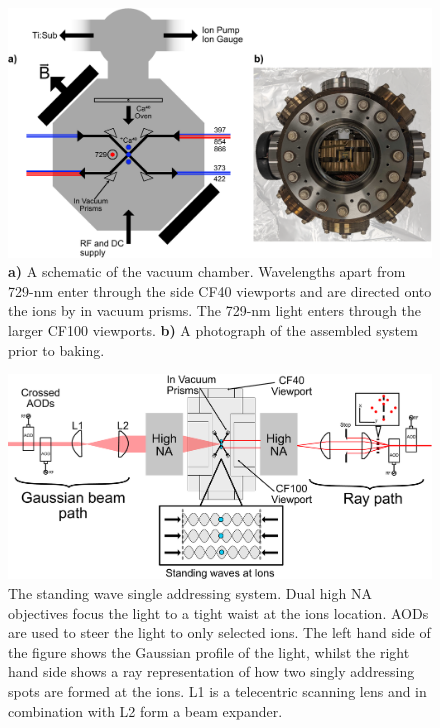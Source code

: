\begin{figure}
  \begin{center}
   \noindent\includegraphics[width=0.9\linewidth]{figures/pdf_figure/vacuum_can-crop.pdf}
  \end{center}
  \caption{
    \textbf{a)} 
    A schematic of the vacuum chamber.
    Wavelengths apart from 729-nm enter through the side CF40 viewports and are
    directed onto the ions by in vacuum prisms. The 729-nm light enters through
    the larger CF100 viewports.  \textbf{b)} A photograph of the assembled
    system prior to baking.
  }
  \label{fig:can}
\end{figure}


\begin{figure}
  \begin{center}
   \noindent\includegraphics[width=\linewidth]{figures/pdf_figure/vac_can_AOD_small.pdf}
  \end{center}
  \caption{
    The standing wave single addressing system. Dual high NA
    objectives focus the light to a tight waist at the ions
    location. AODs are used to steer the light to only selected
    ions. The left hand side of the figure shows the Gaussian profile
    of the light, whilst the right hand side shows a ray
    representation of how two singly addressing spots are formed at
    the ions. L1 is a telecentric scanning lens and in combination
    with L2 form a beam expander.}
  \label{fig:AOD}
\end{figure}

